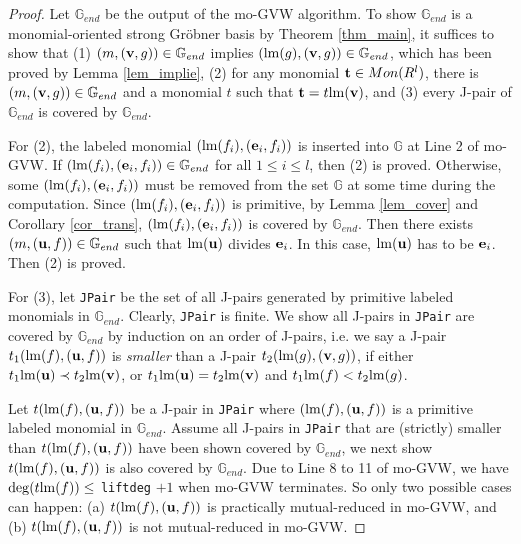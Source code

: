 \documentclass[final, number, 3p,12pt]{elsarticle}
\def\G{{\mathbb{G}}}
\def\lm{{\rm lm}} %
\def\t{{\bf t}}
\def\e{{\bf e}}
\def\u{{\bf u}}
\def\v{{\bf v}}
\def\deg{{\rm deg}}
\begin{document}
\begin{proof}
Let $\G_{end}$ be the output of the mo-GVW algorithm. To show $\G_{end}$ is a monomial-oriented strong Gr\"obner basis by Theorem \ref{thm_main}, it suffices to show that (1) $(m, (\v, g))\in \G_{end}$ implies $(\lm(g), (\v, g))\in \G_{end}$, which has been proved by Lemma \ref{lem_implie}, (2) for any monomial $\t \in Mon(R^l)$, there is $(m, (\v, g)) \in \G_{end}$ and a monomial $t$ such that $\t = t\lm(\v)$, and (3) every J-pair of $\G_{end}$ is covered by $\G_{end}$. 

For (2), the labeled monomial $(\lm(f_i), (\e_i, f_i))$ is inserted into $\G$ at Line 2 of mo-GVW. If $(\lm(f_i), (\e_i, f_i)) \in \G_{end}$ for all $1 \le i \le l$, then (2) is proved. Otherwise, some $(\lm(f_i), (\e_i, f_i))$ must be removed from the set $\G$ at some time during the computation. Since $(\lm(f_i), (\e_i, f_i))$ is primitive, by Lemma \ref{lem_cover} and  Corollary \ref{cor_trans}, $(\lm(f_i), (\e_i, f_i))$ is covered by $\G_{end}$. Then there exists $(m, (\u, f)) \in \G_{end}$ such that $\lm(\u)$ divides $\e_i$. In this case, $\lm(\u)$ has to be $\e_i$. Then (2) is proved.


For (3), let {\tt JPair} be the set of all J-pairs generated by primitive labeled monomials in $\G_{end}$. Clearly, {\tt JPair} is finite. We show all J-pairs in {\tt JPair} are covered by $\G_{end}$ by induction on an order of J-pairs, i.e. we say a J-pair $t_1(\lm(f), (\u, f))$ is {\em smaller} than a J-pair $t_2(\lm(g), (\v, g))$, if either $t_1\lm(\u) \prec t_2\lm(\v)$, or $t_1\lm(\u) = t_2\lm(\v)$ and $t_1\lm(f) < t_2\lm(g)$. 

Let $t(\lm(f), (\u, f))$ be a J-pair in {\tt JPair} where $(\lm(f), (\u, f))$ is a primitive labeled monomial in $\G_{end}$. Assume all J-pairs in {\tt JPair} that are (strictly) smaller than $t(\lm(f), (\u, f))$ have been shown covered by $\G_{end}$, we next show $t(\lm(f), (\u, f))$ is also covered by $\G_{end}$. Due to Line 8 to 11 of mo-GVW, we have $\deg(t\lm(f)) \le $ {\tt liftdeg} $+1$ when mo-GVW terminates. So only two possible cases can happen: (a) $t(\lm(f), (\u, f))$ is practically mutual-reduced in mo-GVW, and (b) $t(\lm(f), (\u, f))$ is not mutual-reduced in mo-GVW.



\end{proof}
\end{document}
